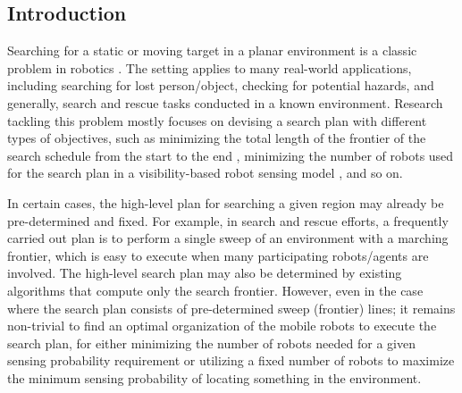 \subsection{Introduction}

Searching for a static or moving target in a planar environment is a classic 
problem in robotics \cite{guibas1999visibility, suzuki1992searching, lavalle2000algorithm, stiffler2017persistent, kolling2007graph}. 
%
The setting applies to many real-world applications, including searching for
lost person/object, checking for potential hazards, and generally, search and rescue tasks conducted in a known environment. 
%
Research tackling this problem mostly focuses on devising a search plan with
different types of objectives, such as minimizing the total length of the
frontier of the search schedule from the start to the end 
\cite{kolling2017coordinated}, minimizing the number of robots used for 
the search plan in a visibility-based robot sensing model
\cite{megiddo1988complexity}, and so on.

In certain cases, the high-level plan for searching a given region may already be pre-determined and fixed. For example, in search and rescue efforts, a frequently carried out plan is to perform a single sweep of an environment with a marching frontier, which is easy to execute when many participating robots/agents are involved.
%
The high-level search plan may also be determined by existing algorithms that 
compute only the search frontier.
%
However, even in the case where the search plan consists of pre-determined 
sweep (frontier) lines; it remains non-trivial to find an optimal organization 
of the mobile robots to execute the search plan, for either minimizing the 
number of robots needed for a given sensing probability requirement or utilizing 
a fixed number of robots to maximize the minimum sensing probability of locating something in the environment. 

